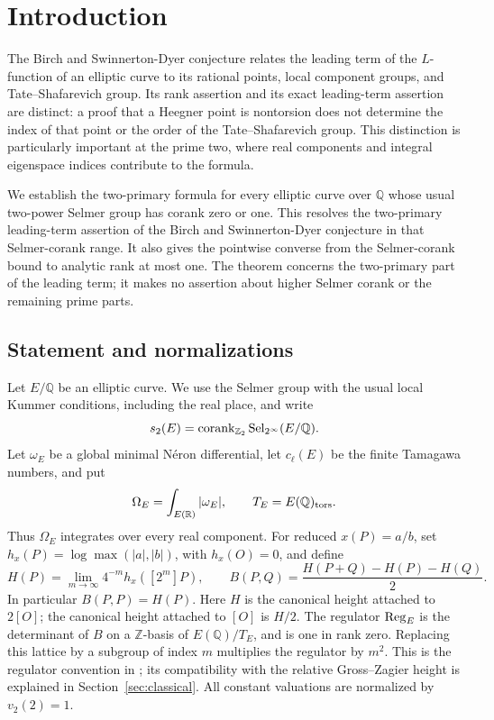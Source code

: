 \section{Introduction}
\label{sec:introduction}

The Birch and Swinnerton-Dyer conjecture relates the leading term of the
\(L\)-function of an elliptic curve to its rational points, local component
groups, and Tate--Shafarevich group.  Its rank assertion and its exact
leading-term assertion are distinct: a proof that a Heegner point is
nontorsion does not determine the index of that point or the order of the
Tate--Shafarevich group.  This distinction is particularly important at
the prime two, where real components and integral eigenspace indices
contribute to the formula.

We establish the two-primary formula for every elliptic curve over
\(\mathbb Q\) whose usual two-power Selmer group has corank zero or one.
This resolves the two-primary leading-term assertion of the Birch and
Swinnerton-Dyer conjecture in that Selmer-corank range.  It also gives the
pointwise converse from the Selmer-corank bound to analytic rank at most
one.  The theorem concerns the two-primary part of the leading term;
it makes no assertion about higher Selmer corank or the remaining prime
parts.

\subsection{Statement and normalizations}

Let \(E/\mathbb Q\) be an elliptic curve.  We use the Selmer group with
the usual local Kummer conditions, including the real place, and write
\[
 s_2(E)=\operatorname{corank}_{\mathbb Z_2}\operatorname{Sel}_{2^\infty}(E/\mathbb Q).
\]
Let \(\omega_E\) be a global minimal N\'eron differential, let
\(c_\ell(E)\) be the finite Tamagawa numbers, and put
\[
 \Omega_E=\int_{E(\mathbb R)}|\omega_E|,
 \qquad T_E=E(\mathbb Q)_{\mathrm{tors}}.
\]
Thus \(\Omega_E\) integrates over every real component.  For reduced
\(x(P)=a/b\), set \(h_x(P)=\log\max(|a|,|b|)\), with
\(h_x(O)=0\), and define
\[
 H(P)=\lim_{m\to\infty}4^{-m}h_x([2^m]P),\qquad
 B(P,Q)=\frac{H(P+Q)-H(P)-H(Q)}2.
\]
In particular \(B(P,P)=H(P)\).  Here \(H\) is the canonical height
attached to \(2[O]\); the canonical height attached to \([O]\) is
\(H/2\).  The regulator \(\operatorname{Reg}_E\) is the
determinant of \(B\) on a \(\mathbb Z\)-basis of
\(E(\mathbb Q)/T_E\), and is one in rank zero.  Replacing this lattice
by a subgroup of index \(m\) multiplies the regulator by \(m^2\).
This is the regulator convention in
\cite[Section~1]{BuhlerGrossZagier1985}; its compatibility with the
relative Gross--Zagier height is explained in
Section~\ref{sec:classical}. All constant valuations are normalized by
\(v_2(2)=1\).

